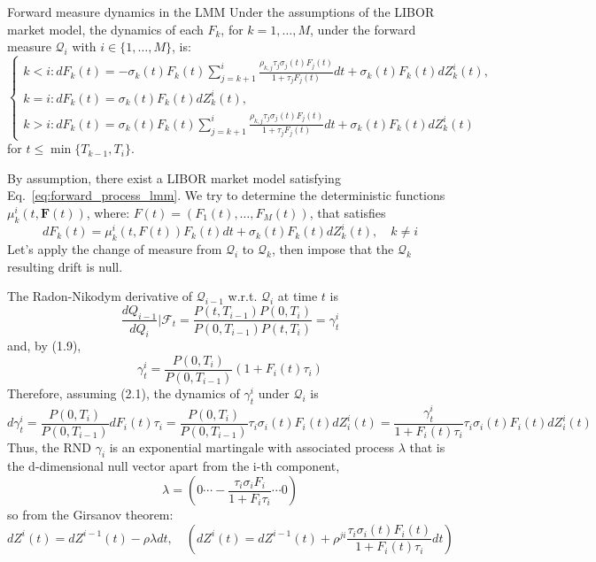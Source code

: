 \documentclass{beamer}
\begin{document}
\begin{frame}
\begin{block}{Forward measure dynamics in the LMM}
Under the assumptions of the LIBOR market model, the dynamics of each $F_k$, for $k = 1,\ldots, M$, under the forward measure $\mathcal{Q}_i$ with $i \in \{1,\ldots, M\}$, is:
\begin{equation*}
	\begin{cases}
		k < i: dF_k(t) = -\sigma_k(t)F_k(t)\sum_{j=k+1}^i\frac{\rho_{k,j}\tau_j\sigma_j(t)F_j(t)}{1+\tau_jF_j(t)}dt + \sigma_k(t)F_k(t)dZ^i_k(t), \\
		k = i : dF_k(t) = \sigma_k(t)F_k(t)dZ_k^i(t), \\
		k > i : dF_k(t) = \sigma_k(t)F_k(t)\sum_{j=k+1}^i\frac{\rho_{k,j}\tau_j\sigma_j(t)F_j(t)}{1+\tau_jF_j(t)}dt + \sigma_k(t)F_k(t)dZ^i_k(t)		
	\end{cases}
\end{equation*}
for $t \le \min\{T_{k-1}, T_i\}$.
\end{block}

By assumption, there exist a LIBOR market model satisfying Eq.~\ref{eq:forward_process_lmm}.
We try to determine the deterministic functions $\mu_k^i(t, \mathbf{F}(t))$, where:
$F(t) = (F_1(t),\ldots, F_M(t))$, that satisfies
\begin{equation*}
dF_k(t) = \mu_k^i(t, F(t))F_k(t)dt + \sigma_k(t)F_k(t)dZ^i_k(t),\quad k\neq i
\end{equation*}
Let's apply the change of measure from $\mathcal{Q}_i$ to $\mathcal{Q}_k$, then impose that the $\mathcal{Q}_k$ resulting drift is null. 
\end{frame}

\begin{frame}
The Radon-Nikodym derivative of $\mathcal{Q}_{i-1}$ w.r.t. $\mathcal{Q}_i$ at time $t$ is
\begin{equation}
\frac{dQ_{i-1}}{dQ_i}|\mathcal{F}_t = \frac{P(t, T_{i-1})P(0, T_i)}{P(0, T_{i-1})P(t, T_i)} = \gamma^i_t
\end{equation}
and, by (1.9),
\begin{equation}
\gamma^i_t = \frac{P(0, T_i)}{P(0, T_{i-1})}(1+F_i(t)\tau_i)
\end{equation}
Therefore, assuming (2.1), the dynamics of $\gamma^i_t$ under $\mathcal{Q}_i$ is
\begin{equation}
d\gamma^i_t =\frac{P(0, T_i)}{P(0, T_{i-1})}dF_i(t)\tau_i = \frac{P(0, T_i)}{P(0, T_{i-1})}\tau_i\sigma_i(t)F_i(t)dZ^i_i(t) = \frac{\gamma_t^i}{1+F_i(t)\tau_i}\tau_i\sigma_i(t)F_i(t)dZ^i_i(t)
\end{equation}
Thus, the RND $\gamma_i$ is an exponential martingale with associated process $\lambda$ that is the d-dimensional null vector apart from the i-th component,
\begin{equation}
\lambda = \left(0\cdots-\frac{\tau_i\sigma_iF_i}{1+F_i\tau_i}\cdots 0\right)
\end{equation}
so from the Girsanov theorem:
\begin{equation}
dZ^i(t) = dZ^{i-1}(t)-\rho\lambda dt,\quad \left(dZ^i(t) = dZ^{i-1}(t)+\rho^{ji}\frac{\tau_i\sigma_i(t)F_i(t)}{1+F_i(t)\tau_i} dt\right)
\end{equation}
\end{frame}
\end{document}
